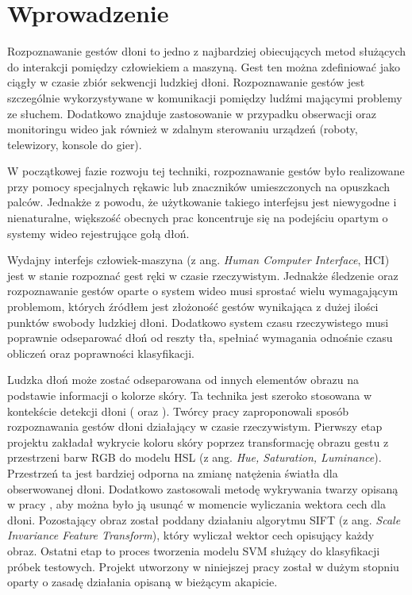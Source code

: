 \chapter{Wprowadzenie}
\label{cha:wprowadzenie}
Rozpoznawanie gestów dłoni to jedno z najbardziej obiecujących metod służących do interakcji pomiędzy człowiekiem a maszyną. Gest ten można zdefiniować jako ciągły w czasie zbiór sekwencji ludzkiej dłoni. Rozpoznawanie gestów jest szczególnie wykorzystywane w komunikacji pomiędzy ludźmi mającymi problemy ze słuchem. Dodatkowo znajduje zastosowanie w przypadku obserwacji oraz monitoringu wideo jak również w zdalnym sterowaniu urządzeń (roboty, telewizory, konsole do gier). 

W początkowej fazie rozwoju tej techniki, rozpoznawanie gestów było realizowane przy pomocy specjalnych rękawic lub znaczników umieszczonych na opuszkach palców. Jednakże z powodu, że użytkowanie takiego interfejsu jest niewygodne i nienaturalne, większość obecnych prac koncentruje się na podejściu opartym o systemy wideo rejestrujące gołą dłoń.

Wydajny interfejs człowiek-maszyna (z ang. \textit{Human Computer Interface}, HCI) jest w stanie rozpoznać gest ręki w czasie rzeczywistym. Jednakże śledzenie oraz rozpoznawanie gestów oparte o system wideo musi sprostać wielu wymagającym problemom, których źródłem jest złożoność gestów wynikająca z dużej ilości punktów swobody ludzkiej dłoni. Dodatkowo system czasu rzeczywistego musi poprawnie odseparować dłoń od reszty tła, spełniać wymagania odnośnie czasu obliczeń oraz poprawności klasyfikacji.

Ludzka dłoń może zostać odseparowana od innych elementów obrazu na podstawie informacji o kolorze skóry. Ta technika jest szeroko stosowana w kontekście detekcji dłoni (\cite{Temp1} oraz \cite{Temp2}). Twórcy pracy \cite{SiftBowSvm} zaproponowali sposób rozpoznawania gestów dłoni działający w czasie rzeczywistym. Pierwszy etap projektu zakładał wykrycie koloru skóry poprzez transformację obrazu gestu z przestrzeni barw RGB do modelu HSL (z ang. \textit{Hue, Saturation, Luminance}). Przestrzeń ta jest bardziej odporna na zmianę natężenia światła dla obserwowanej dłoni. Dodatkowo zastosowali metodę wykrywania twarzy opisaną w pracy \cite{ViolaJonesRobustDetection}, aby można było ją usunąć w momencie wyliczania wektora cech dla dłoni. Pozostający obraz został poddany działaniu algorytmu SIFT (z ang. \textit{Scale Invariance Feature Transform}), który wyliczał wektor cech opisujący każdy obraz. Ostatni etap to proces tworzenia modelu SVM służący do klasyfikacji próbek testowych. Projekt utworzony w niniejszej pracy został w dużym stopniu oparty o zasadę działania opisaną w bieżącym akapicie.


